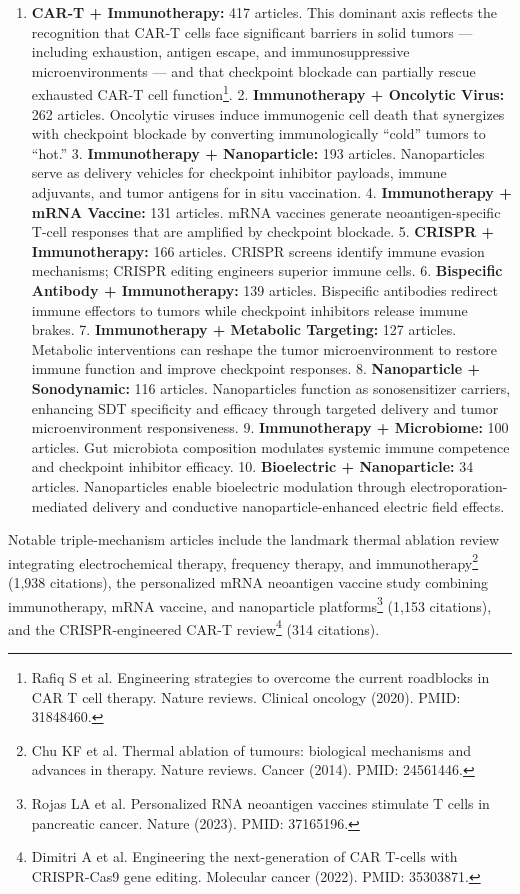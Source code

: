 \documentclass[11pt,twoside,openright]{report}
\begin{document}
\begin{enumerate}
\item \textbf{CAR-T + Immunotherapy:} 417 articles. This dominant axis reflects the recognition that CAR-T cells face significant barriers in solid tumors --- including exhaustion, antigen escape, and immunosuppressive microenvironments --- and that checkpoint blockade can partially rescue exhausted CAR-T cell function\footnote{Rafiq S et al. Engineering strategies to overcome the current roadblocks in CAR T cell therapy. Nature reviews. Clinical oncology (2020). PMID: 31848460.}.
2. \textbf{Immunotherapy + Oncolytic Virus:} 262 articles. Oncolytic viruses induce immunogenic cell death that synergizes with checkpoint blockade by converting immunologically ``cold'' tumors to ``hot.''
3. \textbf{Immunotherapy + Nanoparticle:} 193 articles. Nanoparticles serve as delivery vehicles for checkpoint inhibitor payloads, immune adjuvants, and tumor antigens for in situ vaccination.
4. \textbf{Immunotherapy + mRNA Vaccine:} 131 articles. mRNA vaccines generate neoantigen-specific T-cell responses that are amplified by checkpoint blockade.
5. \textbf{CRISPR + Immunotherapy:} 166 articles. CRISPR screens identify immune evasion mechanisms; CRISPR editing engineers superior immune cells.
6. \textbf{Bispecific Antibody + Immunotherapy:} 139 articles. Bispecific antibodies redirect immune effectors to tumors while checkpoint inhibitors release immune brakes.
7. \textbf{Immunotherapy + Metabolic Targeting:} 127 articles. Metabolic interventions can reshape the tumor microenvironment to restore immune function and improve checkpoint responses.
8. \textbf{Nanoparticle + Sonodynamic:} 116 articles. Nanoparticles function as sonosensitizer carriers, enhancing SDT specificity and efficacy through targeted delivery and tumor microenvironment responsiveness.
9. \textbf{Immunotherapy + Microbiome:} 100 articles. Gut microbiota composition modulates systemic immune competence and checkpoint inhibitor efficacy.
10. \textbf{Bioelectric + Nanoparticle:} 34 articles. Nanoparticles enable bioelectric modulation through electroporation-mediated delivery and conductive nanoparticle-enhanced electric field effects.
\end{enumerate}

Notable triple-mechanism articles include the landmark thermal ablation review integrating electrochemical therapy, frequency therapy, and immunotherapy\footnote{Chu KF et al. Thermal ablation of tumours: biological mechanisms and advances in therapy. Nature reviews. Cancer (2014). PMID: 24561446.} (1,938 citations), the personalized mRNA neoantigen vaccine study combining immunotherapy, mRNA vaccine, and nanoparticle platforms\footnote{Rojas LA et al. Personalized RNA neoantigen vaccines stimulate T cells in pancreatic cancer. Nature (2023). PMID: 37165196.} (1,153 citations), and the CRISPR-engineered CAR-T review\footnote{Dimitri A et al. Engineering the next-generation of CAR T-cells with CRISPR-Cas9 gene editing. Molecular cancer (2022). PMID: 35303871.} (314 citations).
\end{document}
